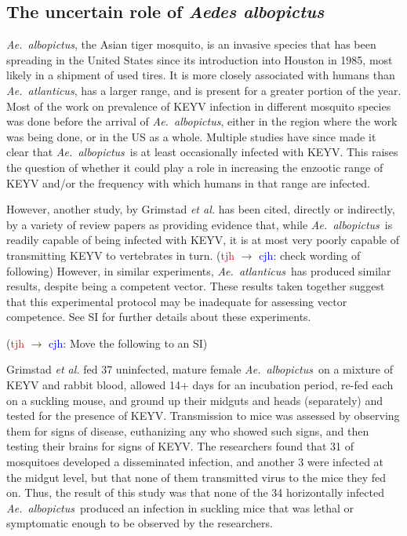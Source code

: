 \documentclass[12pt]{article}
\newcommand{\alb}{\textit{Ae.\ albopictus}}
\newcommand{\atl}{\textit{Ae.\ atlanticus}}
\newcommand{\cjh}{\textcolor{blue}{cjh}}
\newcommand{\tjh}{\textcolor{red}{tjh}}
\newcommand{\msg}[3]{(#1 $\rightarrow$ #2: #3)}
\newcommand{\mtc}[1]{\msg\tjh\cjh{#1}}
\begin{document}
        \subsection{The uncertain role of \textit{Aedes albopictus}}
            \label{albopictus}
            \alb, the Asian tiger mosquito, is an invasive species that has been spreading in the United States since its introduction into Houston in 1985, most likely in a shipment of used tires. It is more closely associated with humans than \atl, has a larger range, and is present for a greater portion of the year. Most of the work on prevalence of KEYV infection in different mosquito species was done before the arrival of \alb, either in the region where the work was being done, or in the US as a whole. Multiple studies have since made it clear that \alb\ is at least occasionally infected with KEYV. This raises the question of whether it could play a role in increasing the enzootic range of KEYV and/or the frequency with which humans in that range are infected.

            However, another study, by Grimstad \textit{et al.} \cite{grimstad1989recently} has been cited, directly or indirectly, by a variety of review papers\cite{asdf,asdf} as providing evidence that, while \alb\ is readily capable of being infected with KEYV, it is at most very poorly capable of transmitting KEYV to vertebrates in turn. \mtc{ check wording of following} However, in similar experiments, \atl\ has produced similar results, despite being a competent vector.  These results taken together suggest that this experimental protocol may be inadequate for assessing vector competence.  See SI for further details about these experiments.
            
        \mtc{Move the following to an SI}

        Grimstad \textit{et al.} fed 37 uninfected, mature female \alb\ on a mixture of KEYV and rabbit blood, allowed 14+ days for an incubation period, re-fed each on a suckling mouse, and ground up their midguts and heads (separately) and tested for the presence of KEYV. Transmission to mice was assessed by observing them for signs of disease, euthanizing any who showed such signs, and then testing their brains for signs of KEYV. The researchers found that 31 of mosquitoes developed a disseminated infection, and another 3 were infected at the midgut level, but that none of them transmitted virus to the mice they fed on. Thus, the result of this study was that none of the 34 horizontally infected \alb\ produced an infection in suckling mice that was lethal or symptomatic enough to be observed by the researchers.
\end{document}
